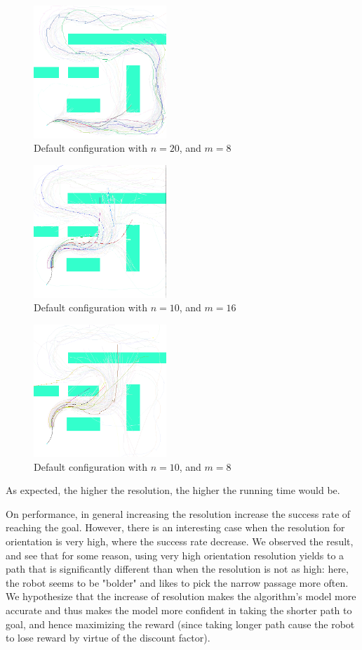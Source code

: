\documentclass[a4paper]{article}
\begin{document}
\begin{figure}
\caption{Default configuration with $n=20$, and $m=8$}
\label{f:b_lowio}
\centerline{\includegraphics[width=5cm]{b_lowio.png}}
\end{figure}

\begin{figure}
\caption{Default configuration with $n=10$, and $m=16$}
\label{f:b_lowres_hio}
\centerline{\includegraphics[width=5cm]{b_lowres_hio.png}}
\end{figure}

\begin{figure}
\caption{Default configuration with $n=10$, and $m=8$}
\label{f:b_lowres_lowio}
\centerline{\includegraphics[width=5cm]{b_lowres_lowio.png}}
\end{figure}

As expected, the higher the resolution, the higher the running time would be.

On performance, in general increasing the resolution increase the success rate of reaching
the goal. However, there is an interesting case when the resolution
for orientation is very high, where the success rate decrease. We observed
the result, and see that for some reason, using very high orientation
resolution yields to a path that is significantly different than when the
resolution is not as high: here, the robot seems to be "bolder" and
likes to pick the narrow passage more often. We hypothesize that the increase
of resolution makes the algorithm's model more accurate and thus makes the model
more confident in taking the shorter path to goal, and hence maximizing the
reward (since taking longer path cause the robot to lose reward by virtue
of the discount factor).
\end{document}
